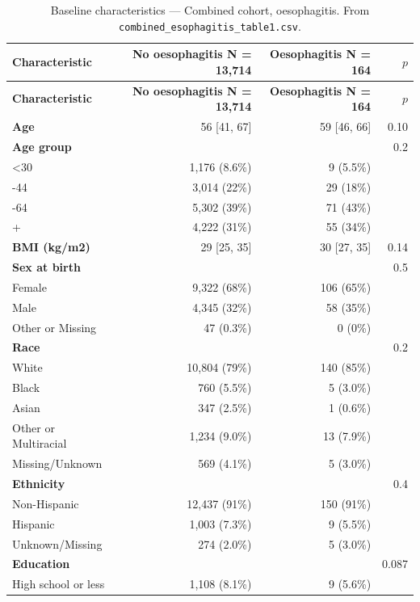 \documentclass[11pt]{article}
\newcommand{\code}[1]{\texttt{\small #1}}
\begin{document}
\footnotesize\begin{longtable}{@{}p{6.4cm}rrr@{}}
\caption{Baseline characteristics --- Combined cohort, oesophagitis. From \code{combined\_esophagitis\_table1.csv}.}\label{tab:appM-t1-combined-esophagitis}\\
\toprule \textbf{Characteristic} & \textbf{No oesophagitis     N = 13,714} & \textbf{Oesophagitis     N = 164} & \textbf{$p$} \\ \midrule \endfirsthead
\toprule \textbf{Characteristic} & \textbf{No oesophagitis     N = 13,714} & \textbf{Oesophagitis     N = 164} & \textbf{$p$} \\ \midrule \endhead
\textbf{Age} & 56 [41, 67] & 59 [46, 66] & 0.10 \\
\textbf{Age group} &  &  & 0.2 \\
\quad <30 & 1,176 (8.6\%) & 9 (5.5\%) &  \\
\quad 30-44 & 3,014 (22\%) & 29 (18\%) &  \\
\quad 45-64 & 5,302 (39\%) & 71 (43\%) &  \\
\quad 65+ & 4,222 (31\%) & 55 (34\%) &  \\
\textbf{BMI (kg/m2)} & 29 [25, 35] & 30 [27, 35] & 0.14 \\
\textbf{Sex at birth} &  &  & 0.5 \\
\quad Female & 9,322 (68\%) & 106 (65\%) &  \\
\quad Male & 4,345 (32\%) & 58 (35\%) &  \\
\quad Other or Missing & 47 (0.3\%) & 0 (0\%) &  \\
\textbf{Race} &  &  & 0.2 \\
\quad White & 10,804 (79\%) & 140 (85\%) &  \\
\quad Black & 760 (5.5\%) & 5 (3.0\%) &  \\
\quad Asian & 347 (2.5\%) & 1 (0.6\%) &  \\
\quad Other or Multiracial & 1,234 (9.0\%) & 13 (7.9\%) &  \\
\quad Missing/Unknown & 569 (4.1\%) & 5 (3.0\%) &  \\
\textbf{Ethnicity} &  &  & 0.4 \\
\quad Non-Hispanic & 12,437 (91\%) & 150 (91\%) &  \\
\quad Hispanic & 1,003 (7.3\%) & 9 (5.5\%) &  \\
\quad Unknown/Missing & 274 (2.0\%) & 5 (3.0\%) &  \\
\textbf{Education} &  &  & 0.087 \\
\quad High school or less & 1,108 (8.1\%) & 9 (5.6\%) &  \\

\end{longtable}
\end{document}
